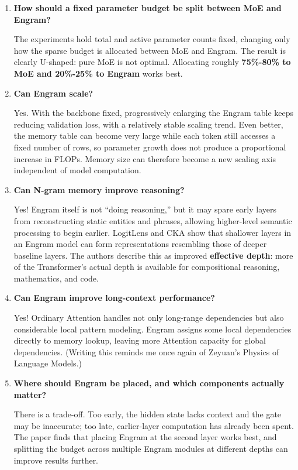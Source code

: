 \documentclass[
  11pt,
  a4paper,
]{article}
\begin{document}
\begin{enumerate}
\def\labelenumi{\arabic{enumi}.}
\item
  \textbf{How should a fixed parameter budget be split between MoE and
  Engram?}

  The experiments hold total and active parameter counts fixed, changing
  only how the sparse budget is allocated between MoE and Engram. The
  result is clearly U-shaped: pure MoE is not optimal. Allocating
  roughly \textbf{75\%-80\% to MoE and 20\%-25\% to Engram} works best.
\item
  \textbf{Can Engram scale?}

  Yes. With the backbone fixed, progressively enlarging the Engram table
  keeps reducing validation loss, with a relatively stable scaling
  trend. Even better, the memory table can become very large while each
  token still accesses a fixed number of rows, so parameter growth does
  not produce a proportional increase in FLOPs. Memory size can
  therefore become a new scaling axis independent of model computation.
\item
  \textbf{Can N-gram memory improve reasoning?}

  Yes! Engram itself is not ``doing reasoning,'' but it may spare early
  layers from reconstructing static entities and phrases, allowing
  higher-level semantic processing to begin earlier. LogitLens and CKA
  show that shallower layers in an Engram model can form representations
  resembling those of deeper baseline layers. The authors describe this
  as improved \textbf{effective depth}: more of the Transformer's actual
  depth is available for compositional reasoning, mathematics, and code.
\item
  \textbf{Can Engram improve long-context performance?}

  Yes! Ordinary Attention handles not only long-range dependencies but
  also considerable local pattern modeling. Engram assigns some local
  dependencies directly to memory lookup, leaving more Attention
  capacity for global dependencies. (Writing this reminds me once again
  of Zeyuan's Physics of Language Models.)
\item
  \textbf{Where should Engram be placed, and which components actually
  matter?}

  There is a trade-off. Too early, the hidden state lacks context and
  the gate may be inaccurate; too late, earlier-layer computation has
  already been spent. The paper finds that placing Engram at the second
  layer works best, and splitting the budget across multiple Engram
  modules at different depths can improve results further.


\end{enumerate}
\end{document}
